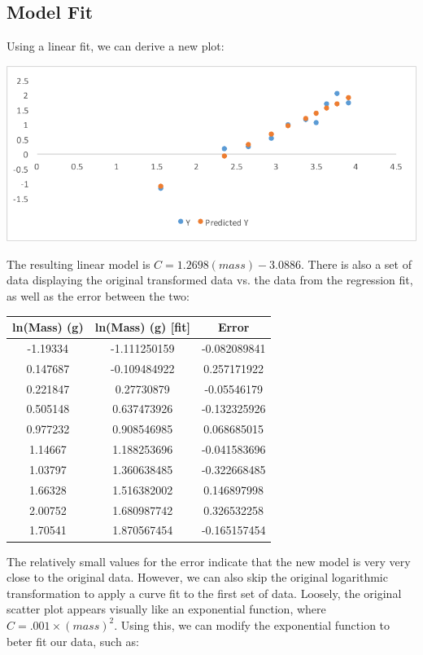 \documentclass[10pt,letterpaper]{article}
\begin{document}
		\subsection{Model Fit}
			Using a linear fit, we can derive a new plot:
			\newline \newline
			\centerline{\includegraphics{Picture3.pdf}}
			\newline \newline
			The resulting linear model is $C = 1.2698(mass) - 3.0886$. There is also a set of data displaying the original transformed data vs. the data from the regression fit, as well as the error between the two:
			\begin{center}
				\begin{tabular}{c c c}
					ln(Mass) (g) & ln(Mass) (g) [fit] & Error \\
					\hline
					-1.19334 & -1.111250159 & -0.082089841 \\
					0.147687 & -0.109484922 & 0.257171922 \\
					0.221847 & 0.27730879 & -0.05546179 \\
					0.505148 & 0.637473926 & -0.132325926 \\
					0.977232 & 0.908546985 & 0.068685015 \\
					1.14667 & 1.188253696 & -0.041583696 \\
					1.03797 & 1.360638485 & -0.322668485 \\
					1.66328 & 1.516382002 & 0.146897998 \\
					2.00752 & 1.680987742 & 0.326532258 \\
					1.70541 & 1.870567454 & -0.165157454
				\end{tabular}
			\end{center}
			The relatively small values for the error indicate that the new model is very very close to the original data. 
			\newline \newline
			However, we can also skip the original logarithmic transformation to apply a curve fit to the first set of data. Loosely, the original scatter plot appears visually like an exponential function, where $C = .001 \times (mass)^{2}$. Using this, we can modify the exponential function to beter fit our data, such as:
\end{document}
